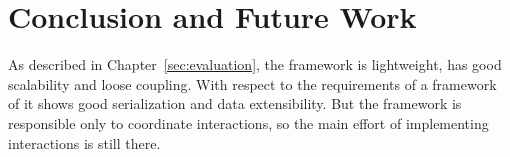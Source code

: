 \chapter{Conclusion and Future Work}\label{sec:conclusion}

As described in Chapter~\ref{sec:evaluation}, the framework is lightweight, has good scalability and loose coupling.
With respect to the requirements of a framework of \cmvs{} it shows good serialization and data extensibility.
But the framework is responsible only to coordinate interactions, so the main effort of implementing interactions is still there.





